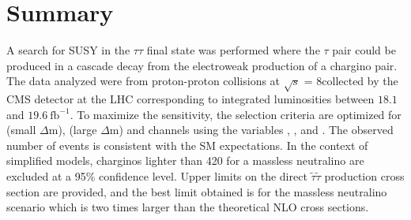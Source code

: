 \section{Summary}
\label{sect:conclusion}
A search for SUSY in the $\tau\tau$ final state was performed where the
$\tau$ pair could be produced in a cascade decay from the electroweak production of a chargino pair.  The data analyzed were from proton-proton collisions
at $\sqrt{s}$ = 8\TeV collected by the CMS detector at the LHC corresponding to integrated luminosities between $18.1$ and $19.6~\mathrm{fb}^{-1}$.%
To maximize the sensitivity, the selection criteria are optimized for \tauTau (small $\Delta$m), 
\tauTau (large $\Delta$m) and \leptonTau channels using the variables \mttwo, \tauMT, and \SumMT.
The observed number of events is consistent with the SM expectations. 
In the context of simplified models, charginos lighter than 420\GeV 
for a massless neutralino are excluded at a 95\% confidence level.
Upper limits on the direct $\tilde{\tau}\tilde{\tau}$ production cross section are provided, and the best limit obtained is for the massless neutralino scenario which is two times
larger than the theoretical NLO cross sections. 

